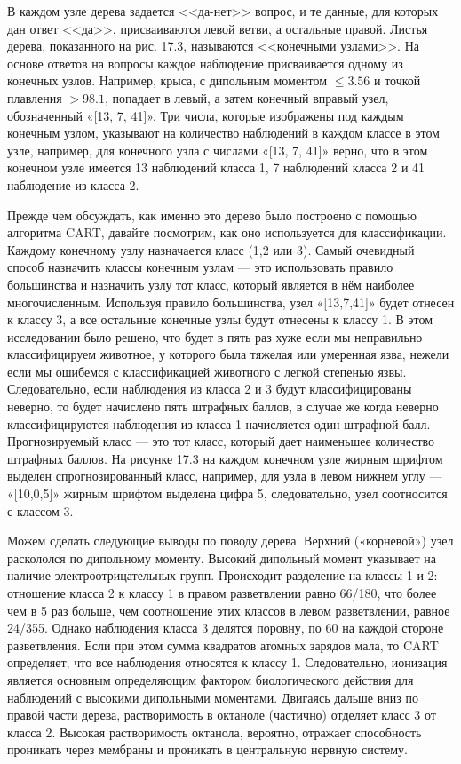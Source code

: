В каждом узле дерева задается <<да-нет>> вопрос, и те данные, для которых дан ответ <<да>>, присваиваются левой ветви, а остальные правой. Листья дерева, показанного на рис. 17.3, называются <<конечными узлами>>. На основе ответов на вопросы каждое наблюдение присваивается одному из конечных узлов. Например, крыса, с дипольным моментом $\leq 3.56$ и точкой плавления $>98.1$, попадает в левый, а затем конечный вправый узел, обозначенный «[13, 7, 41]». 
Три числа, которые изображены под каждым конечным узлом, указывают на количество наблюдений в каждом классе в этом узле, например, для конечного узла с числами «[13, 7, 41]» верно, что в этом конечном узле имеется 13 наблюдений класса 1, 7 наблюдений  класса 2 и 41 наблюдение из класса 2.

Прежде чем обсуждать, как именно это дерево было построено с помощью алгоритма CART, давайте посмотрим, как оно используется для классификации. Каждому конечному узлу назначается класс (1,2 или 3). Самый очевидный способ назначить классы конечным узлам --- это использовать правило большинства и назначить узлу тот класс, который является в нём наиболее многочисленным. Используя правило большинства, узел «[13,7,41]» будет отнесен к классу 3, а все остальные конечные узлы будут отнесены к классу 1. В этом исследовании было решено, что будет в пять раз хуже если мы неправильно классифицируем животное, у которого была тяжелая или умеренная язва, нежели если мы ошибемся с классификацией животного с легкой степенью язвы. Следовательно, если наблюдения из класса 2 и 3 будут классифицированы неверно, то будет начислено пять штрафных баллов, в случае же когда неверно классифицируются наблюдения из класса 1 начисляется один штрафной балл. Прогнозируемый класс --- это тот класс, который дает наименьшее количество штрафных баллов. На рисунке 17.3 на каждом конечном узле жирным шрифтом выделен спрогнозированный класс, например, для узла в левом нижнем углу --- «[10,0,5]» жирным шрифтом выделена цифра 5, следовательно, узел соотносится с классом 3.


Можем сделать следующие выводы по поводу дерева. Верхний («корневой») узел раскололся по дипольному моменту. Высокий дипольный момент указывает на наличие электроотрицательных групп. Происходит разделение на классы 1 и 2: отношение класса 2 к классу 1 в правом разветвлении равно 66/180, что более  чем в 5 раз больше, чем соотношение этих классов в левом разветвлении, равное 24/355. Однако наблюдения класса 3 делятся поровну, по 60 на каждой стороне разветвления. Если при этом сумма квадратов атомных зарядов мала, то CART определяет, что все наблюдения относятся к классу 1. Следовательно, ионизация является основным определяющим фактором биологического действия для наблюдений с высокими дипольными моментами. Двигаясь дальше вниз по правой части дерева, растворимость в октаноле (частично) отделяет класс 3 от класса 2. Высокая растворимость октанола, вероятно, отражает способность проникать через мембраны и проникать в центральную нервную систему. 

